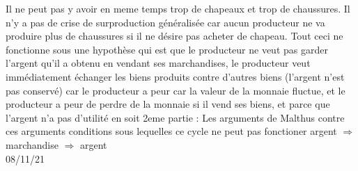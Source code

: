 \documentclass{article}
\begin{document}
Il ne peut pas y avoir en meme temps trop de chapeaux et trop de chaussures. Il n'y a pas de crise de surproduction généralisée car aucun producteur ne va produire plus de chaussures si il ne désire pas acheter de chapeau. Tout ceci ne fonctionne sous une hypothèse qui est que le producteur ne veut pas garder l'argent qu'il a obtenu en vendant ses marchandises, le producteur veut immédiatement échanger les biens produits contre d'autres biens (l'argent n'est pas conservé) car le producteur a peur car la valeur de la monnaie fluctue, et le producteur a peur de perdre de la monnaie si il vend ses biens, et parce que l'argent n'a pas d'utilité en soit 
2eme partie : Les arguments de Malthus contre ces arguments conditions sous lequelles ce cycle ne
peut pas fonctioner argent $\Rightarrow$ marchandise $\Rightarrow$ argent \\
08/11/21\\
\end{document}
